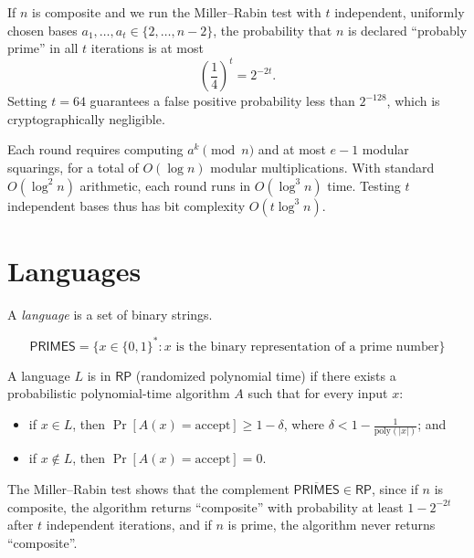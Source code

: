 \begin{remark}
    If \(n\) is composite and we run the Miller--Rabin test with \(t\) independent, uniformly chosen bases \(a_1, \dots, a_t \in \{2, \dots, n-2\}\), the probability that \(n\) is declared ``probably prime'' in all \(t\) iterations is at most
    \[
        \left( \frac{1}{4} \right)^t = 2^{-2t}.
    \]
    Setting \(t = 64\) guarantees a false positive probability less than \(2^{-128}\), which is cryptographically negligible.
    
    Each round requires computing \(a^k \pmod{n}\) and at most \(e - 1\) modular squarings, for a total of \(O(\log n)\) modular multiplications.
    With standard \(O(\log^2 n)\) arithmetic, each round runs in \(O(\log^3 n)\) time.
    Testing \(t\) independent bases thus has bit complexity \(O(t \log^3 n)\).
\end{remark}

\section*{Languages}

A \emph{language} is a set of binary strings.

\begin{example}
    \[
        \mathsf{PRIMES} = \{x \in \{0, 1\}^* : x \text{ is the binary representation of a prime number}\}
    \]
\end{example}

\begin{definition}
    A language \(L\) is in \(\mathsf{RP}\) (randomized polynomial time) if there exists a probabilistic polynomial-time algorithm \(A\) such that for every input \(x\):
    \begin{itemize}
        \item if \(x \in L\), then \(\Pr[A(x) = \text{accept}] \geq 1-\delta\), where \(\delta < 1 - \frac{1}{\text{poly}(|x|)}\); and
        \item if \(x \notin L\), then \(\Pr[A(x) = \text{accept}] = 0\).
    \end{itemize}
\end{definition}

The Miller--Rabin test shows that the complement \(\overline{\mathsf{PRIMES}} \in \mathsf{RP}\), since if \(n\) is composite, the algorithm returns ``composite'' with probability at least \(1 - 2^{-2t}\) after \(t\) independent iterations, and if \(n\) is prime, the algorithm never returns ``composite''.


